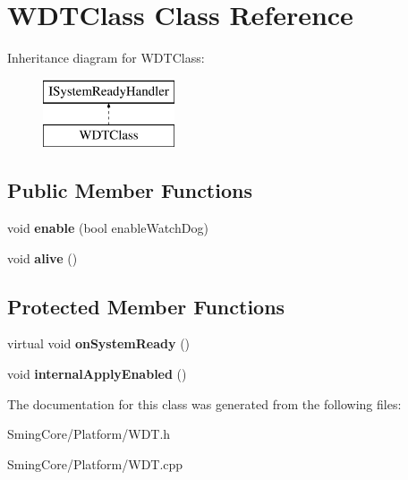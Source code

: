 \hypertarget{class_w_d_t_class}{}\section{W\+D\+T\+Class Class Reference}
\label{class_w_d_t_class}
Inheritance diagram for W\+D\+T\+Class\+:\begin{figure}[H]
\begin{center}
\leavevmode
\includegraphics[height=2.000000cm]{class_w_d_t_class}
\end{center}
\end{figure}
\subsection*{Public Member Functions}
\begin{DoxyCompactItemize}
\item 
\hypertarget{class_w_d_t_class_acba31b19643861dcbfaa8c58bfb8f82b}{}void {\bfseries enable} (bool enable\+Watch\+Dog)\label{class_w_d_t_class_acba31b19643861dcbfaa8c58bfb8f82b}

\item 
\hypertarget{class_w_d_t_class_ac142c43f548a7cfe7c0d739c7abee1c8}{}void {\bfseries alive} ()\label{class_w_d_t_class_ac142c43f548a7cfe7c0d739c7abee1c8}

\end{DoxyCompactItemize}
\subsection*{Protected Member Functions}
\begin{DoxyCompactItemize}
\item 
\hypertarget{class_w_d_t_class_ab3b3f8755b98e469ae8229007e352b42}{}virtual void {\bfseries on\+System\+Ready} ()\label{class_w_d_t_class_ab3b3f8755b98e469ae8229007e352b42}

\item 
\hypertarget{class_w_d_t_class_acf8e8af865240ab519353ab7c37f5ee5}{}void {\bfseries internal\+Apply\+Enabled} ()\label{class_w_d_t_class_acf8e8af865240ab519353ab7c37f5ee5}

\end{DoxyCompactItemize}


The documentation for this class was generated from the following files\+:\begin{DoxyCompactItemize}
\item 
Sming\+Core/\+Platform/W\+D\+T.\+h\item 
Sming\+Core/\+Platform/W\+D\+T.\+cpp\end{DoxyCompactItemize}
